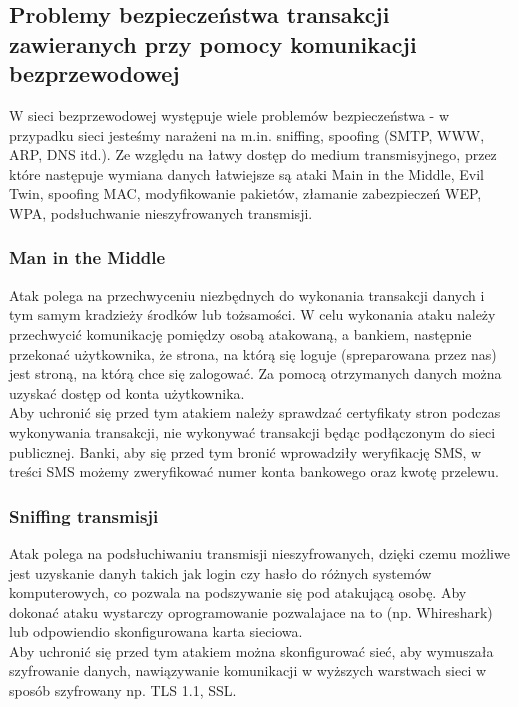 \subsection{Problemy bezpieczeństwa transakcji zawieranych przy pomocy komunikacji bezprzewodowej}

W sieci bezprzewodowej występuje wiele problemów bezpieczeństwa - w przypadku sieci jesteśmy narażeni na m.in. sniffing, spoofing (SMTP, WWW, ARP, DNS itd.). Ze względu na łatwy dostęp do medium transmisyjnego, przez które następuje wymiana danych łatwiejsze są ataki Main in the Middle, Evil Twin, spoofing MAC, modyfikowanie pakietów, złamanie zabezpieczeń WEP, WPA, podsłuchwanie nieszyfrowanych transmisji.

\subsubsection{Man in the Middle}

Atak polega na przechwyceniu niezbędnych do wykonania transakcji danych i tym samym kradzieży środków lub tożsamości. W celu wykonania ataku należy przechwycić komunikację pomiędzy osobą atakowaną, a bankiem, następnie przekonać użytkownika, że strona, na którą się loguje (spreparowana przez nas) jest stroną, na którą chce się zalogować. Za pomocą otrzymanych danych można uzyskać dostęp od konta użytkownika. \\

Aby uchronić się przed tym atakiem należy sprawdzać certyfikaty stron podczas wykonywania transakcji, nie wykonywać transakcji będąc podłączonym do sieci publicznej. Banki, aby się przed tym bronić wprowadziły weryfikację SMS, w treści SMS możemy zweryfikować numer konta bankowego oraz kwotę przelewu.


\subsubsection{Sniffing transmisji}

Atak polega na podsłuchiwaniu transmisji nieszyfrowanych, dzięki czemu możliwe jest uzyskanie danyh takich jak login czy hasło do różnych systemów komputerowych, co pozwala na podszywanie się pod atakującą osobę. Aby dokonać ataku wystarczy oprogramowanie pozwalajace na to (np. Whireshark) lub odpowiendio skonfigurowana karta sieciowa. \\
Aby uchronić się przed tym atakiem można skonfigurować sieć, aby wymuszała szyfrowanie danych, nawiązywanie komunikacji w wyższych warstwach sieci w sposób szyfrowany np. TLS 1.1, SSL.


